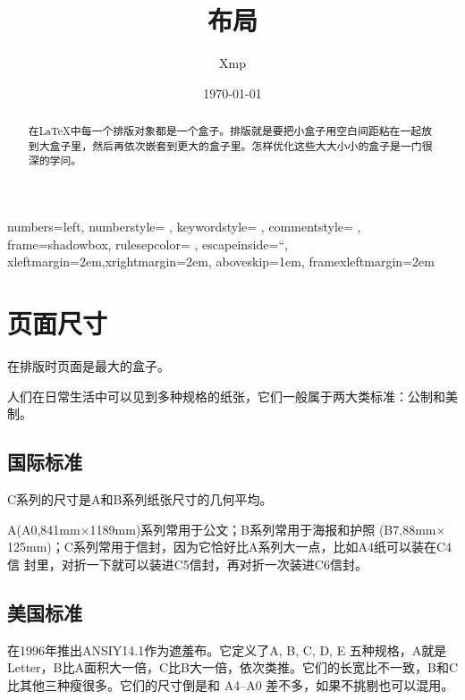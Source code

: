 \documentclass[UTF8]{article}
\title{布局}
\author{Xmp}
\date{\today}
\begin{document}
\setcounter{tocdepth}{5}
\maketitle	
\begin{abstract}
在\LaTeX 中每一个排版对象都是一个盒子。排版就是要把小盒子用空白间距粘在一起放到大盒子里，然后再依次嵌套到更大的盒子里。怎样优化这些大大小小的盒子是一门很深的学问。
\end{abstract}
\tableofcontents

\lstset
{
	numbers=left, 
	numberstyle= \tiny, 
	keywordstyle= \color{ blue!70},
	commentstyle= \color{red!50!green!50!blue!50}, 
	frame=shadowbox, %
	rulesepcolor= \color{ red!20!green!20!blue!20} ,
	escapeinside=``, %
	xleftmargin=2em,xrightmargin=2em, aboveskip=1em,
	framexleftmargin=2em
}

\section{页面尺寸}
在排版时页面是最大的盒子。

人们在日常生活中可以见到多种规格的纸张，它们一般属于两大类标准：公制和美制。

\subsection{国际标准}
C系列的尺寸是A和B系列纸张尺寸的几何平均。

A(A0,841mm$\times$1189mm)系列常用于公文；B系列常用于海报和护照 (B7,88mm$\times$125mm)；C系列常用于信封，因为它恰好比A系列大一点，比如A4纸可以装在C4信
封里，对折一下就可以装进C5信封，再对折一次装进C6信封。


\subsection{美国标准}
在1996年推出ANSIY14.1作为遮羞布。它定义了A, B, C, D, E 五种规格，A就是 Letter，B比A面积大一倍，C比B大一倍，依次类推。它们的长宽比不一致，B和C比其他三种瘦很多。它们的尺寸倒是和 A4–A0 差不多，如果不挑剔也可以混用。
\end{document}

